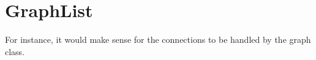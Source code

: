 \section{GraphList}
For instance, it would make sense for the connections to be handled by
the graph class.
